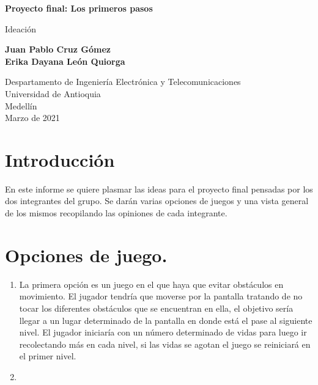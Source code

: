 \documentclass{article}
\begin{document}
\begin{titlepage}
    \begin{center}
        \vspace*{1cm}
            
        \Huge
        \textbf{Proyecto final: Los primeros pasos}
            
        \vspace{0.5cm}
        \LARGE
        Ideación
            
        \vspace{1.5cm}
            
        \textbf{Juan Pablo Cruz Gómez\\
                Erika Dayana León Quiorga}
            
        \vfill
            
        \vspace{0.8cm}
            
        \Large
        Despartamento de Ingeniería Electrónica y Telecomunicaciones\\
        Universidad de Antioquia\\
        Medellín\\
        Marzo de 2021
            
    \end{center}
\end{titlepage}

\tableofcontents
\newpage
\section{Introducción}\label{intro}
En este informe se quiere plasmar las ideas para el proyecto final pensadas por los dos integrantes del grupo. Se darán varias opciones de juegos y una vista general de los mismos recopilando las opiniones de cada integrante.

\section{Opciones de juego.} \label{contenido}
\begin{enumerate}
  \item La primera opción es un juego en el que haya que evitar obstáculos en movimiento. El jugador tendría que moverse por la pantalla tratando de no tocar los diferentes obstáculos que se encuentran en ella, el objetivo sería llegar a un lugar determinado de la pantalla en donde está el pase al siguiente nivel. El jugador iniciaría con un número determinado de vidas para luego ir recolectando más en cada nivel, si las vidas se agotan el juego se reiniciará en el primer nivel.
  \item

\end{enumerate}
\end{document}
